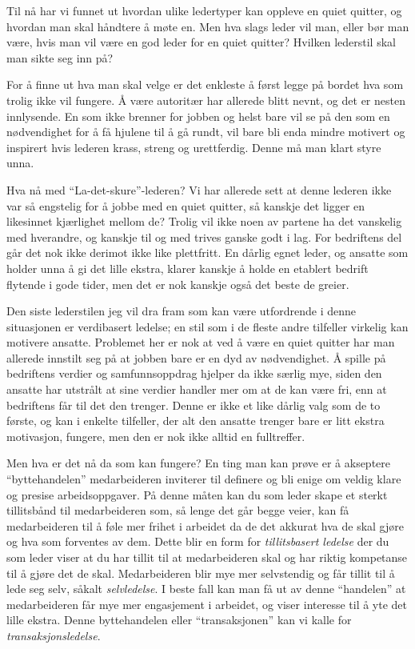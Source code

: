 \documentclass[a4paper, 12pt]{article}  %
\begin{document}
Til nå har vi funnet ut hvordan ulike ledertyper kan oppleve en quiet quitter, og hvordan man skal håndtere å møte en. 
Men hva slags leder vil man, eller bør man være, hvis man vil være en god leder for en quiet quitter? 
Hvilken lederstil skal man sikte seg inn på?

For å finne ut hva man skal velge er det enkleste å først legge på bordet hva som trolig ikke vil fungere. 
Å være autoritær har allerede blitt nevnt, og det er nesten innlysende. 
En som ikke brenner for jobben og helst bare vil se på den som en nødvendighet for å få hjulene til å gå rundt, vil bare bli enda mindre motivert og inspirert hvis lederen krass, streng og urettferdig.
Denne må man klart styre unna.

Hva nå med ``La-det-skure''-lederen? 
Vi har allerede sett at denne lederen ikke var så engstelig for å jobbe med en quiet quitter, så kanskje det ligger en likesinnet kjærlighet mellom de? 
Trolig vil ikke noen av partene ha det vanskelig med hverandre, og kanskje til og med trives ganske godt i lag. 
For bedriftens del går det nok ikke derimot ikke like plettfritt.
En dårlig egnet leder, og ansatte som holder unna å gi det lille ekstra, klarer kanskje å holde en etablert bedrift flytende i gode tider, men det er nok kanskje også det beste de greier.

Den siste lederstilen jeg vil dra fram som kan være utfordrende i denne situasjonen er verdibasert ledelse; en stil som i de fleste andre tilfeller virkelig kan motivere ansatte. 
Problemet her er nok at ved å være en quiet quitter har man allerede innstilt seg på at jobben bare er en dyd av nødvendighet.
Å spille på bedriftens verdier og samfunnsoppdrag hjelper da ikke særlig mye, siden den ansatte har utstrålt at sine verdier handler mer om at de kan være fri, enn at bedriftens får til det den trenger.
Denne er ikke et like dårlig valg som de to første, og kan i enkelte tilfeller, der alt den ansatte trenger bare er litt ekstra motivasjon, fungere, men den er nok ikke alltid en fulltreffer.

Men hva er det nå da som kan fungere? 
En ting man kan prøve er å akseptere ``byttehandelen'' medarbeideren inviterer til definere og bli enige om veldig klare og presise arbeidsoppgaver.
På denne måten kan du som leder skape et sterkt tillitsbånd til medarbeideren som, så lenge det går begge veier, kan få medarbeideren til å føle mer frihet i arbeidet da de det akkurat hva de skal gjøre og hva som forventes av dem. 
Dette blir en form for \emph{tillitsbasert ledelse} der du som leder viser at du har tillit til at medarbeideren skal og har riktig kompetanse til å gjøre det de skal. 
Medarbeideren blir mye mer selvstendig og får tillit til å lede seg selv, såkalt \emph{selvledelse}.
I beste fall kan man få ut av denne ``handelen'' at medarbeideren får mye mer engasjement i arbeidet, og viser interesse til å yte det lille ekstra. Denne byttehandelen eller ``transaksjonen'' kan vi kalle for \emph{transaksjonsledelse}.
\end{document}
